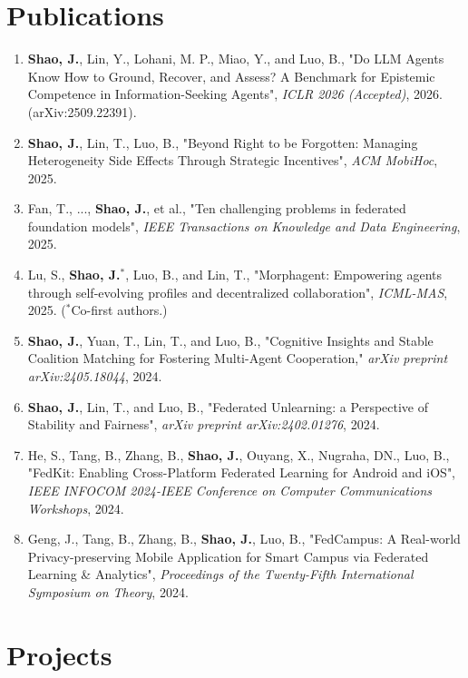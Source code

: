 \documentclass[10pt,a4paper]{article}
\begin{document}
\section*{\color{sectioncolor}Publications}
\begin{enumerate}[label=\textcolor{accentcolor}{\arabic*.}, leftmargin=*, itemsep=0.6em]
    \item \textbf{Shao, J.}, Lin, Y., Lohani, M. P., Miao, Y., and Luo, B., "Do LLM Agents Know How to Ground, Recover, and Assess? A Benchmark for Epistemic Competence in Information-Seeking Agents", \textit{ICLR 2026 (Accepted)}, 2026. (arXiv:2509.22391).
    \item \textbf{Shao, J.}, Lin, T., Luo, B., "Beyond Right to be Forgotten: Managing Heterogeneity Side Effects Through Strategic Incentives", \textit{ACM MobiHoc}, 2025.
    \item Fan, T., ..., \textbf{Shao, J.}, et al., "Ten challenging problems in federated foundation models", \textit{IEEE Transactions on Knowledge and Data Engineering}, 2025.
    \item Lu, S., \textbf{Shao, J.}$^{*}$, Luo, B., and Lin, T., "Morphagent: Empowering agents through self-evolving profiles and decentralized collaboration", \textit{ICML-MAS}, 2025. ($^{*}$Co-first authors.)
    \item \textbf{Shao, J.}, Yuan, T., Lin, T., and Luo, B., "Cognitive Insights and Stable Coalition Matching for Fostering Multi-Agent Cooperation," \textit{arXiv preprint arXiv:2405.18044}, 2024.
    \item \textbf{Shao, J.}, Lin, T., and Luo, B., "Federated Unlearning: a Perspective of Stability and Fairness", \textit{arXiv preprint arXiv:2402.01276}, 2024.
    \item He, S., Tang, B., Zhang, B., \textbf{Shao, J.}, Ouyang, X., Nugraha, DN., Luo, B., "FedKit: Enabling Cross-Platform Federated Learning for Android and iOS", \textit{IEEE INFOCOM 2024-IEEE Conference on Computer Communications Workshops}, 2024.
    \item Geng, J., Tang, B., Zhang, B., \textbf{Shao, J.}, Luo, B., "FedCampus: A Real-world Privacy-preserving Mobile Application for Smart Campus via Federated Learning \& Analytics", \textit{Proceedings of the Twenty-Fifth International Symposium on Theory}, 2024.


\end{enumerate}
\vspace{0.5em}

\section*{\color{sectioncolor}Projects}
\end{document}
